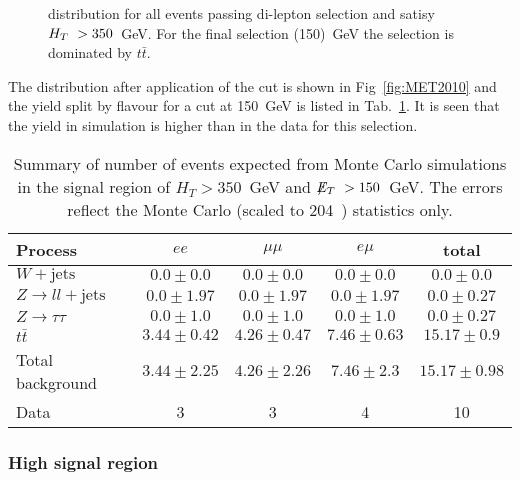 \begin{figure}[hbtp]
  \hfill
  \caption{\MET distribution for all events passing di-lepton selection and satisy $H_T~> 350$~GeV. For the final \MET selection (150)~GeV the selection is dominated by $t\bar{t}$.}
\end{figure}

The \MET distribution after application of the \HT
cut is shown in Fig~\ref{fig:MET2010} and
the yield split by flavour for a cut at 150~GeV is listed in Tab.~\ref{tab:2010}.
It is seen that the yield in simulation is higher
than in the data for this selection.

\begin{table}[htb]
\begin{center}
\caption{\label{tab:2010}\protect Summary of number of events expected from Monte Carlo simulations in 
the signal region of $H_T> 350$~GeV and $\displaystyle{\not} E_T~> 150$~GeV. The errors reflect the Monte Carlo (scaled
    to 204~\pbi) statistics only.}
\begin{tabular}{l|ccc|c}
\hline
Process           & $ee$       & $\mu\mu$     & $e\mu$   & total   \\
\hline\hline
$W+\textrm{jets}$&$0.0 \pm 0.0$&$0.0 \pm 0.0$&$0.0 \pm 0.0$&$0.0 \pm 0.0$\\
$Z\rightarrow ll+\textrm{jets}$&$0.0 \pm 1.97$&$0.0 \pm 1.97$&$0.0 \pm 1.97$&$0.0 \pm 0.27$\\
$Z \rightarrow \tau\tau$&$0.0 \pm 1.0$&$0.0 \pm 1.0$&$0.0 \pm 1.0$&$0.0 \pm 0.27$\\
$t\bar{t}$&$3.44 \pm 0.42$&$4.26 \pm 0.47$&$7.46 \pm 0.63$&$15.17 \pm 0.9$\\
\hline
Total background&$3.44 \pm 2.25$&$4.26 \pm 2.26$&$7.46 \pm 2.3$&$15.17 \pm 0.98$\\
\hline
Data  & 3 & 3 & 4 & 10 \\
\hline\hline
\end{tabular}
\end{center}
\end{table}

\subsubsection{High \HT signal region}


